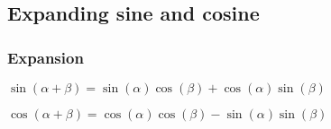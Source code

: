 
\subsection{Expanding sine and cosine}

\subsubsection{Expansion}

$\sin (\alpha +\beta )=\sin (\alpha )\cos(\beta )+\cos(\alpha )\sin (\beta )$

$\cos (\alpha +\beta )=\cos (\alpha )\cos(\beta )-\sin(\alpha )\sin (\beta )$


